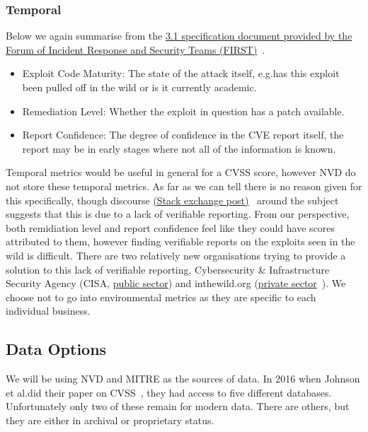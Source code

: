 \subsubsection{Temporal}

Below we again summarise from the \href{https://www.first.org/cvss/v3.1/specification-document}{3.1 specification document provided by the Forum of Incident Response and Security Teams (FIRST)}~\cite{CVSS_31}.

\begin{itemize}
	\item Exploit Code Maturity: The state of the attack itself, e.g.\@ has this exploit been pulled off in the wild or is it currently academic.

	\item Remediation Level: Whether the exploit in question has a patch available.
	\item Report Confidence: The degree of confidence in the CVE report itself, the report may be in early stages where not all of the information is known.
\end{itemize}


\bigskip

Temporal metrics would be useful in general for a CVSS score, however NVD do not store these temporal metrics. As far as we can tell there is no reason given for this specifically, though discourse \href{https://security.stackexchange.com/questions/270257/cvss-v3-and-v3-1-missing-temporal-metrics-exploit-code-maturity-and-remediation}{(Stack exchange post)}~\cite{stack_exchange} around the subject suggests that this is due to a lack of verifiable reporting. From our perspective, both remidiation level and report confidence feel like they could have scores attributed to them, however finding verifiable reports on the exploits seen in the wild is difficult. There are two relatively new organisations trying to provide a solution to this lack of verifiable reporting, Cybersecurity \& Infrastructure Security Agency (CISA, \href{https://www.cisa.gov/known-exploited-vulnerabilities-catalog}{public sector}) and inthewild.org (\href{https://inthewild.io/}{private sector}~\cite{cisa}). We choose not to go into environmental metrics as they are specific to each individual business.


\subsection{Data Options}

We will be using NVD and MITRE as the sources of data. In 2016 when Johnson et al.\@ did their paper
on CVSS~\cite{bayes}, they had access to five different databases. Unfortunately only two of these
remain for modern data. There are others, but they are either in archival or proprietary status.

